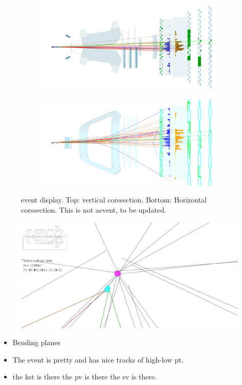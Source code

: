 \begin{figure}[t]
  \centering
  \begin{subfigure}{\textwidth}
    \raggedright
    \includegraphics[width=\textwidth]{Figures/Chapter2/top}
    \caption{}
    \label{det_evt_display_top}
  \end{subfigure}
  \begin{subfigure}{\textwidth}
    \raggedleft
    \includegraphics[width=\textwidth]{Figures/Chapter2/side}
    \caption{}
    \label{det_evt_display_side}
  \end{subfigure}
  \caption{\BsJpsiKst event display. Top: vertical corssection. Bottom: Horizontal corssection.
  {\color{red} This is not a\BsJpsiKst event, to be updated.}}
  \label{det_evt_display}
\end{figure}

\begin{figure}[t]
  \centering
  \begin{turn}{90}
    \includegraphics[width=1.5\textwidth]{Figures/Chapter2/jpsikst_event.pdf}
  \end{turn}
  \caption{}
\end{figure}

\begin{itemize}
  \item Bending planes
  \item The event is pretty and has nice tracks of high-low pt.
  \item the kst is there the pv is there the sv is there.
\end{itemize}
